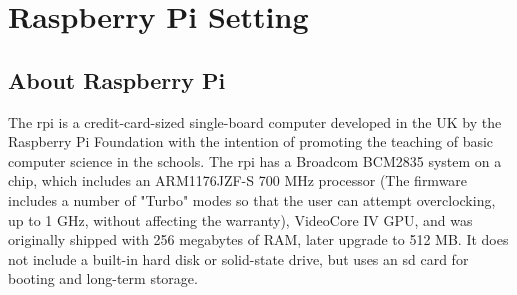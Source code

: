 \chapter{Raspberry Pi Setting}
\label{chp:rpi}

\section{About Raspberry Pi}
\par The \gls{rpi} is a credit-card-sized single-board computer developed in the UK by the Raspberry Pi Foundation with the intention of promoting the teaching of basic computer science in the schools. \cite{rpi} The \gls{rpi} has a Broadcom BCM2835 system on a chip, which includes an ARM1176JZF-S 700 MHz processor (The firmware includes a number of "Turbo" modes so that the user can attempt overclocking, up to 1 GHz, without affecting the warranty), VideoCore IV GPU, and was originally shipped with 256 megabytes of RAM, later upgrade to 512 MB. It does not include a built-in hard disk or solid-state drive, but uses an \gls{sd} card for booting and long-term storage.

